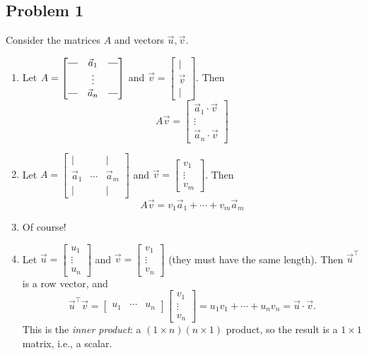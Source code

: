 \documentclass[11pt]{article}
\newcommand{\rotvert}{\rotatebox[origin=c]{90}{$\vert$}}
\begin{document}
\subsection*{Problem 1}
Consider the matrices $A$ and vectors $\vec{u},\vec{v}$.
\begin{enumerate}
    \item[(a)] Let $A=\begin{bmatrix} \rotvert & \vec{a}_1 & \rotvert \\  & \vdots &  \\ \rotvert & \vec{a}_n & \rotvert \end{bmatrix}$ and $\vec{v}= \begin{bmatrix} \mid \\ \vec{v} \\ \mid \end{bmatrix}$. Then \[ A\vec{v}= \begin{bmatrix} \vec{a}_1\cdot \vec{v} \\ \vdots \\ \vec{a}_n\cdot \vec{v} \end{bmatrix} \]
    \item[(b)] Let $A=\begin{bmatrix} \mid &  & \mid \\ \vec{a}_1 & \cdots & \vec{a}_m \\ \mid &  & \mid \end{bmatrix}$ and $\vec{v}= \begin{bmatrix} v_1 \\ \vdots \\ v_m \end{bmatrix}$. Then \[ A\vec{v}= v_1\vec{a}_1 + \cdots + v_m\vec{a}_m \]
    \item[(c)] Of course!
    \item[(d)] Let $\vec{u}= \begin{bmatrix} u_1 \\ \vdots \\ u_n \end{bmatrix}$ and $\vec{v}= \begin{bmatrix} v_1 \\ \vdots \\ v_n \end{bmatrix}$ (they must have the same length). Then $\vec{u}^\top$ is a row vector, and \[ \vec{u}^\top\vec{v}= \begin{bmatrix} u_1 & \cdots & u_n \end{bmatrix} \begin{bmatrix} v_1 \\ \vdots \\ v_n \end{bmatrix} = u_1v_1 + \cdots + u_nv_n = \vec{u}\cdot\vec{v}. \] This is the \emph{inner product}: a $(1\times n)(n\times 1)$ product, so the result is a $1\times 1$ matrix, i.e., a scalar.

\end{enumerate}
\end{document}
